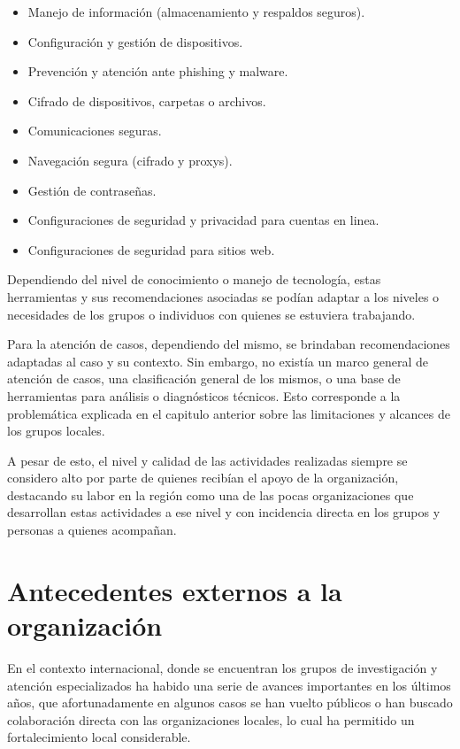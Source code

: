 \documentclass[12pt]{caltech_thesis}
\begin{document}
\begin{itemize}
    \item Manejo de información (almacenamiento y respaldos seguros).
    \item Configuración y gestión de dispositivos.
    \item Prevención y atención ante phishing y malware.
    \item Cifrado de dispositivos, carpetas o archivos.
    \item Comunicaciones seguras.
    \item Navegación segura (cifrado y proxys).
    \item Gestión de contraseñas.
    \item Configuraciones de seguridad y privacidad para cuentas en linea.
    \item Configuraciones de seguridad para sitios web.
\end{itemize}

Dependiendo del nivel de conocimiento o manejo de tecnología, estas herramientas y sus recomendaciones asociadas se podían adaptar a los niveles o necesidades de los grupos o individuos con quienes se estuviera trabajando.

Para la atención de casos, dependiendo del mismo, se brindaban recomendaciones adaptadas al caso y su contexto. Sin embargo, no existía un marco general de atención de casos, una clasificación general de los mismos, o una base de herramientas para análisis o diagnósticos técnicos. Esto corresponde a la problemática explicada en el capitulo anterior sobre las limitaciones y alcances de los grupos locales.

A pesar de esto, el nivel y calidad de las actividades realizadas siempre se considero alto por parte de quienes recibían el apoyo de la organización, destacando su labor en la región como una de las pocas organizaciones que desarrollan estas actividades a ese nivel y con incidencia directa en los grupos y personas a quienes acompañan.

\section{Antecedentes externos a la organización}

En el contexto internacional, donde se encuentran los grupos de investigación y atención especializados ha habido una serie de avances importantes en los últimos años, que afortunadamente en algunos casos se han vuelto públicos o han buscado colaboración directa con las organizaciones locales, lo cual ha permitido un fortalecimiento local considerable.
\end{document}
